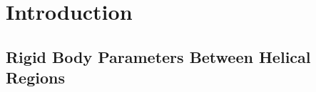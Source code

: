 \chapter{Introduction}
%
%
\label{clustering} 



\section{Rigid Body Parameters Between Helical Regions}


%
\printindex

